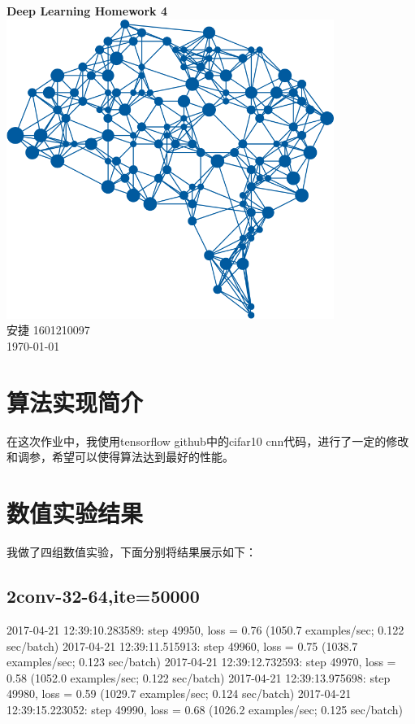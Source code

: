 \documentclass[a4paper, UTF8]{ctexrep}
\begin{document}
    \begin{titlepage}
        \centering
        \vspace{6cm}
        \LARGE{\textbf{Deep Learning Homework 4}}\\
        \vspace{4cm}
        \includegraphics[width=0.8\textwidth]{deepLearning.png}\\
        \vspace{4cm}
        \normalsize{安捷 1601210097}\\
        \normalsize{\today}
    \end{titlepage}
        \section{算法实现简介}
        	在这次作业中，我使用tensorflow github中的cifar10 cnn代码，进行了一定的修改和调参，希望可以使得算法达到最好的性能。
        \section{数值实验结果}
          我做了四组数值实验，下面分别将结果展示如下：
          \subsection{2conv-32-64,ite=50000}
            2017-04-21 12:39:10.283589: step 49950, loss = 0.76 (1050.7 examples/sec; 0.122 sec/batch)
            2017-04-21 12:39:11.515913: step 49960, loss = 0.75 (1038.7 examples/sec; 0.123 sec/batch)
            2017-04-21 12:39:12.732593: step 49970, loss = 0.58 (1052.0 examples/sec; 0.122 sec/batch)
            2017-04-21 12:39:13.975698: step 49980, loss = 0.59 (1029.7 examples/sec; 0.124 sec/batch)
            2017-04-21 12:39:15.223052: step 49990, loss = 0.68 (1026.2 examples/sec; 0.125 sec/batch)
\end{document}
